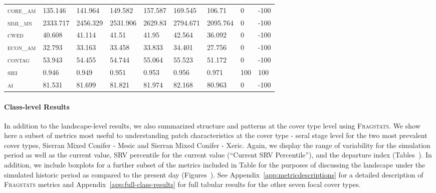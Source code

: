 \begin{table}[!htbp]
\begin{tabular}{@{}llllll|lll@{}}
 \textsc{core\_am}         &   135.146  &   141.964  &   149.582  &   157.587  &   169.545    &   106.71        &   0        &   -100 \\
 \textsc{simi\_mn}         &   2333.717 &   2456.329 &   2531.906 &   2629.83  &   2794.671   &   2095.764      &   0        &   -100 \\
 \textsc{cwed}             &   40.608   &   41.114   &   41.51    &   41.95    &   42.564     &   36.092        &   0        &   -100 \\
 \textsc{econ\_am}         &   32.793   &   33.163   &   33.458   &   33.833   &   34.401     &   27.756        &   0        &   -100 \\
 \textsc{contag}           &   53.943   &   54.455   &   54.744   &   55.064   &   55.523     &   51.172        &   0        &   -100 \\
 \textsc{siei}             &   0.946    &   0.949    &   0.951    &   0.953    &   0.956      &   0.971         &   100      &   100  \\
 \textsc{ai}               &   81.531   &   81.699   &   81.821   &   81.974   &   82.168     &   80.963        &   0        &   -100 \\ \bottomrule
\end{tabular}
\end{table}




\clearpage


\paragraph{Class-level Results}

In addition to the landscape-level results, we also summarized structure and patterns at the cover type level using \textsc{Fragstats}. We show here a subset of metrics most useful to understanding patch characteristics at the cover type - seral stage level for the two most prevalent cover types, Sierran Mixed Conifer - Mesic and Sierran Mixed Conifer - Xeric. Again, we display the range of variability for the simulation period as well as the current value, SRV percentile for the current value (``Current SRV Percentile''), and the departure index (Tables~). In addition, we include boxplots for a further subset of the metrics included in Table for the purposes of discussing the landscape under the simulated historic period as compared to the present day (Figures~). See Appendix~\ref{app:metricdescriptions} for a detailed description of \textsc{Fragstats} metrics and Appendix~\ref{app:full-class-results} for full tabular results for the other seven focal cover types.


